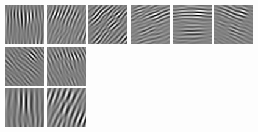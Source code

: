 \begin{figure}
\begin{center}
  \includegraphics[scale=0.5]{ch4/figures/imag_1_0.jpg}
  \includegraphics[scale=0.5]{ch4/figures/imag_1_1.jpg}
  \includegraphics[scale=0.5]{ch4/figures/imag_1_2.jpg}
  \includegraphics[scale=0.5]{ch4/figures/imag_1_3.jpg}
  \includegraphics[scale=0.5]{ch4/figures/imag_1_4.jpg}
  \includegraphics[scale=0.5]{ch4/figures/imag_1_5.jpg}
  \includegraphics[scale=0.5]{ch4/figures/imag_1_6.jpg}
  \includegraphics[scale=0.5]{ch4/figures/imag_1_7.jpg}\\
  \includegraphics[scale=0.5]{ch4/figures/imag_2_0.jpg}
  \includegraphics[scale=0.5]{ch4/figures/imag_2_1.jpg}

\end{center}
\end{figure}
